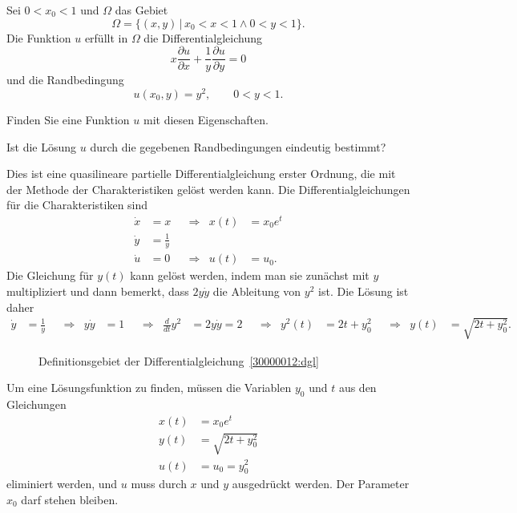Sei $0 < x_0 < 1$ und $\Omega$ das Gebiet
\[
\Omega=\{ (x,y)\,|\, x_0<x<1\wedge 0 < y < 1\}.
\]
Die Funktion $u$ erfüllt in $\Omega$ die Differentialgleichung
\begin{equation}
x\frac{\partial u}{\partial x}
+
\frac1y\frac{\partial u}{\partial y}
=
0
\label{30000012:dgl}
\end{equation}
und die Randbedingung 
\[
u(x_0,y)=y^2,\qquad 0<y<1.
\]
\begin{teilaufgaben}
\item
Finden Sie eine Funktion $u$ mit diesen Eigenschaften.
\item
Ist die Lösung $u$ durch die gegebenen Randbedingungen eindeutig bestimmt?
\end{teilaufgaben}

\begin{loesung}
Dies ist eine quasilineare partielle Differentialgleichung erster Ordnung,
die mit der Methode der Charakteristiken gelöst werden kann.
Die Differentialgleichungen für die Charakteristiken sind
\[
\begin{aligned}
\dot x &= x       &&\Rightarrow&   x(t) &= x_0 e^t \\
\dot y &= \frac1y &&           &        &          \\
\dot u &= 0       &&\Rightarrow&   u(t) &= u_0.
\end{aligned}
\]
Die Gleichung für $y(t)$ kann gelöst werden, indem man sie zunächst mit
$y$ multipliziert und dann bemerkt, dass $2y\dot y$ die Ableitung von $y^2$
ist.
Die Lösung ist daher
\begin{align*}
\dot y &= \frac1y
&&\Rightarrow&
y\dot y &= 1
&&\Rightarrow&
\frac{d}{dt}y^2&=2y\dot y=2
&&\Rightarrow&
y^2(t) &= 2t + y_0^2
&&\Rightarrow&
y(t)&=\sqrt{2t+y_0^2}.
\end{align*}
\begin{figure}
\centering
{}
\caption{Definitionsgebiet der Differentialgleichung~\ref{30000012:dgl}
\label{30000012:domain}}
\end{figure}
\begin{teilaufgaben}
\item
Um eine Lösungsfunktion zu finden, müssen die Variablen $y_0$ und $t$ aus den
Gleichungen
\begin{align*}
x(t) &= x_0e^t\\
y(t)&=\sqrt{2t+y_0^2}\\
u(t)&=u_0 = y_0^2
\end{align*}
eliminiert werden, und $u$ muss durch $x$ und $y$ ausgedrückt werden.
Der Parameter $x_0$ darf stehen bleiben.


\end{teilaufgaben}
\end{loesung}
